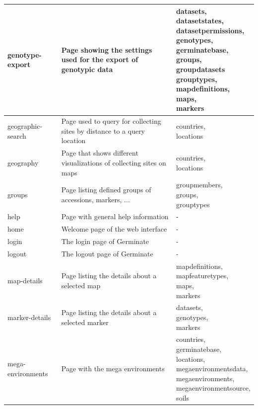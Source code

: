 \begin{longtable}{p{}p{}p{}}
	genotype-export         & Page showing the settings used for the export of genotypic data & \cellwrap{datasets,\\datasetstates,\\datasetpermissions,\\genotypes,\\germinatebase,\\groups,\\groupdatasets\\grouptypes,\\mapdefinitions,\\maps,\\markers} \\ \midrule
	geographic-search       & Page used to query for collecting sites by distance to a query location & \cellwrap{countries,\\locations} \\ \midrule
	geography              & Page that shows different visualizations of collecting sites on maps & \cellwrap{countries,\\locations} \\ \midrule
	groups				   & Page listing defined groups of accessions, markers, ... & \cellwrap{groupmembers,\\groups,\\grouptypes} \\ \midrule
	help				   & Page with general help information & - \\ \midrule
	home				   & Welcome page of the web interface & - \\ \midrule
	login                  & The login page of Germinate & - \\ \midrule
	logout				   & The logout page of Germinate & - \\ \midrule
	map-details			   & Page listing the details about a selected map & \cellwrap{mapdefinitions,\\mapfeaturetypes,\\maps,\\markers} \\ \midrule
	marker-details          & Page listing the details about a selected marker & \cellwrap{datasets,\\genotypes,\\markers} \\ \midrule
	mega-environments       & Page with the mega environments & \cellwrap{countries,\\germinatebase,\\locations,\\megaenvironmentsdata,\\megaenvironments,\\megaenvironmentsource,\\soils}\\ \midrule

\end{longtable}
